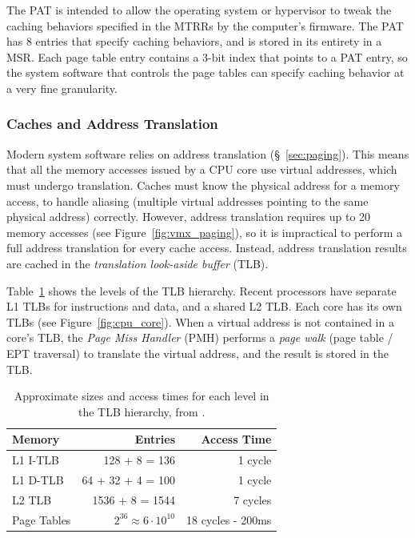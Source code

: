 The PAT is intended to allow the operating system or hypervisor to tweak the
caching behaviors specified in the MTRRs by the computer's firmware. The PAT
has 8 entries that specify caching behaviors, and is stored in its entirety in
a MSR. Each page table entry contains a 3-bit index that points to a PAT entry,
so the system software that controls the page tables can specify caching
behavior at a very fine granularity.


\subsubsection{Caches and Address Translation}
\label{sec:tlbs}

Modern system software relies on address translation (\S~\ref{sec:paging}).
This means that all the memory accesses issued by a CPU core use virtual
addresses, which must undergo translation. Caches must know the physical
address for a memory access, to handle aliasing (multiple virtual addresses
pointing to the same physical address) correctly. However, address translation
requires up to 20 memory accesses (see Figure~\ref{fig:vmx_paging}), so it is
impractical to perform a full address translation for every cache access.
Instead, address translation results are cached in the \textit{translation
look-aside buffer} (TLB).

Table~\ref{fig:tlb_timings} shows the levels of the TLB hierarchy. Recent
processors have separate L1 TLBs for instructions and data, and a shared L2
TLB. Each core has its own TLBs (see Figure~\ref{fig:cpu_core}). When a virtual
address is not contained in a core's TLB, the \textit{Page Miss Handler} (PMH)
performs a \textit{page walk} (page table / EPT traversal) to translate the
virtual address, and the result is stored in the TLB.

\begin{table}[hbt]
  \centering
  \begin{tabular}{| l | r | r |}
  \hline
  \textbf{Memory} & \textbf{Entries} & \textbf{Access Time}\\
  \hline
  L1 I-TLB & 128 + 8 = 136 & 1 cycle \\
  \hline
  L1 D-TLB & 64 + 32 + 4 = 100 & 1 cycle \\
  \hline
  L2 TLB & 1536 + 8 = 1544 & 7 cycles \\
  \hline
  Page Tables & $2^{36} \approx 6 \cdot 10^{10} $ & 18 cycles - 200ms \\
  \hline
  \end{tabular}
  \caption{
    Approximate sizes and access times for each level in the TLB hierarchy,
    from \cite{7zip2014haswell}.
  }
  \label{fig:tlb_timings}
\end{table}

